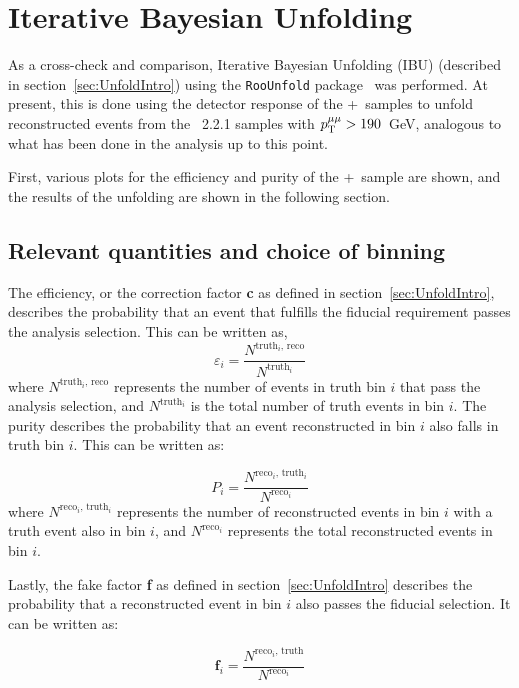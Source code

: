 \section{Iterative Bayesian Unfolding}
\label{app:IBU}

As a cross-check and comparison, Iterative Bayesian Unfolding (IBU) (described in section~\ref{sec:UnfoldIntro}) using the \texttt{RooUnfold} package~\cite{Adye:2011gm} was performed. At present, this is done using the detector response of the \powheg+\pythia~samples to unfold reconstructed events from the \sherpa~2.2.1 samples with $p_\mathrm{T}^{\mu\mu} > 190$~GeV, analogous to what has been done in the analysis up to this point.

First, various plots for the efficiency and purity of the \powheg+\pythia~sample are shown, and the results of the unfolding are shown in the following section.

\subsection{Relevant quantities and choice of binning}
The efficiency, or the correction factor \textbf{c} as defined in section~\ref{sec:UnfoldIntro}, describes the probability that an event that fulfills the fiducial requirement passes the analysis selection. This can be written as,
\begin{equation}
  \varepsilon_i=\frac{N^{\text{truth$_i$, reco}}}{N^{\text{truth$_i$}}}
\end{equation}
where $N^{\text{truth$_i$, reco}}$ represents the number of events in truth bin $i$ that pass the analysis selection, and $N^{\text{truth$_i$}}$ is the total number of truth events in bin $i$. The purity describes the probability that an event reconstructed in bin $i$ also falls in truth bin $i$. This can be written as:

\begin{equation}
  P_i=\frac{N^{\text{reco$_i$, truth$_i$}}}{N^{\text{reco$_i$}}}
\end{equation}
where $N^{\text{reco$_i$, truth$_i$}}$ represents the number of reconstructed events in bin $i$ with a truth event also in bin $i$, and $N^{\text{reco$_i$}}$ represents the total reconstructed events in bin $i$.

Lastly, the fake factor \textbf{f} as defined in section~\ref{sec:UnfoldIntro} describes the probability that a reconstructed event in bin $i$ also passes the fiducial selection. It can be written as:

\begin{equation}
  \textbf{f}_i = \frac{N^{\text{reco$_i$, truth}}}{N^{\text{reco$_i$}}}
\end{equation}

